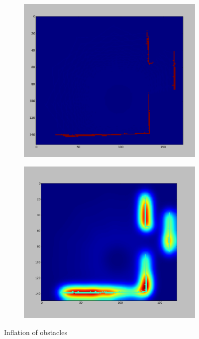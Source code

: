\begin{figure}
    \begin{subfigure}[b]{0.498\textwidth}
		\includegraphics[width=\textwidth, height=\textwidth]{images/inflation.png}
		\label{subfig:a}
		\caption{}
	\end{subfigure}
	\begin{subfigure}[b]{0.498\textwidth}
		\includegraphics[width=\textwidth, height=\textwidth]{images/inflated_obs.png}
		\label{subfig:b}
		\caption{}
	\end{subfigure}
\caption{Inflation of obstacles}
\end{figure}




























